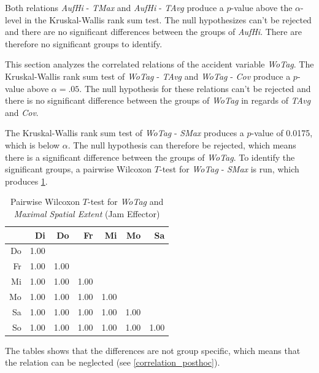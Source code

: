Both relations \textit{AufHi} - \textit{TMax} and \textit{AufHi} - \textit{TAvg} produce a $p$-value above the $\alpha$-level in the Kruskal-Wallis rank sum test. The null hypothesizes can't be rejected and there are no significant differences between the groups of \textit{AufHi}. There are therefore no significant groups to identify.

This section analyzes the correlated relations of the accident variable \textit{WoTag}. The Kruskal-Wallis rank sum test of \textit{WoTag} - \textit{TAvg} and \textit{WoTag} - \textit{Cov} produce a $p$-value above $\alpha=.05$. The null hypothesis for these relations can't be rejected and there is no significant difference between the groups of \textit{WoTag} in regards of \textit{TAvg} and \textit{Cov}.

The Kruskal-Wallis rank sum test of \textit{WoTag} - \textit{SMax} produces a $p$-value of 0.0175, which is below $\alpha$. The null hypothesis can therefore be rejected, which means there is a significant difference between the groups of \textit{WoTag}. To identify the significant groups, a pairwise Wilcoxon $T$-test for \textit{WoTag} - \textit{SMax} is run, which produces \cref{tbl:wilcoxon_baysis_effector_WoTag_TMax}. 
\begin{table}[ht!]
	\tiny
	\centering
	\begin{tabular}{rrrrrrr}
		\toprule
		   & Di & Do & Fr & Mi & Mo & Sa \\ 
		\midrule
		Do & 1.00 &  &  &  &  &  \\ 
		Fr & 1.00 & 1.00 &  &  &  &  \\ 
		Mi & 1.00 & 1.00 & 1.00 &  &  &  \\ 
		Mo & 1.00 & 1.00 & 1.00 & 1.00 &  &  \\ 
		Sa & 1.00 & 1.00 & 1.00 & 1.00 & 1.00 &  \\ 
		So & 1.00 & 1.00 & 1.00 & 1.00 & 1.00 & 1.00 \\ 
		\bottomrule
	  \end{tabular}
    \caption{Pairwise Wilcoxon $T$-test for \textit{WoTag} and \textit{Maximal Spatial Extent} (Jam Effector)}
    \label{tbl:wilcoxon_baysis_effector_WoTag_TMax}
\end{table}
The tables shows that the differences are not group specific, which means that the relation can be neglected (see \cref{correlation_posthoc}).

